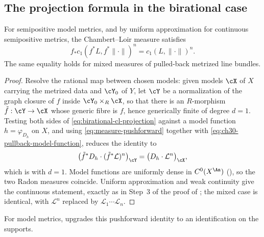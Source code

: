 \subsection{The projection formula in the birational case}
\label{sec:ch30-birational-projection}

\begin{proposition}\label{prop:birational-model-projection}
For semipositive model metrics, and by uniform approximation for continuous
semipositive metrics, the Chambert--Loir measure satisfies
\begin{equation}
\label{eq:birational-cl-projection}
              f_*c_1(f^*L,f^*\|\cdot\|)^n
              =c_1(L,\|\cdot\|)^n.
\end{equation}
The same equality holds for mixed measures of pulled-back metrized line
bundles.
\end{proposition}

\begin{proof}
Resolve the rational map between chosen models: given models \(\cX\) of
\(X\) carrying the metrized data and \(\cY_0\) of \(Y\), let \(\cY\) be a
normalization of the graph closure of \(f\) inside \(\cY_0\times_R\cX\),
so that there is an \(R\)-morphism \(\tilde f:\cY\to\cX\) whose generic
fibre is \(f\), hence generically finite of degree \(d=1\).  Testing both
sides of \eqref{eq:birational-cl-projection} against a model function
\(h=\varphi_{D_h}\) on \(X\), and using
\eqref{eq:measure-pushforward} together with
\eqref{eq:ch30-pullback-model-function}, reduces the identity to
\[
 \bigl(\tilde f^*D_h\cdot(\tilde f^*\mathcal L)^n\bigr)_{\cY}
 =\bigl(D_h\cdot\mathcal L^n\bigr)_{\cX},
\]
which is  with \(d=1\).  Model functions
are uniformly dense in \(C^0(X^{\An})\)
(), so the two Radon measures
coincide.  Uniform approximation and weak continuity give the continuous
statement, exactly as in Step~3 of the proof of
; the mixed case is identical, with
\(\mathcal L^n\) replaced by \(\mathcal L_1\cdots\mathcal L_n\).
\end{proof}

For model metrics,  upgrades this
pushforward identity to an identification on the supports.


